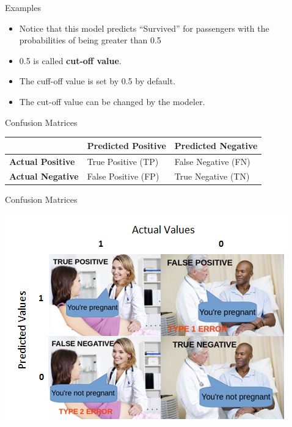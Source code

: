 \documentclass[
  ignorenonframetext,
]{beamer}
\providecommand{\tightlist}{%
  \setlength{\itemsep}{0pt}\setlength{\parskip}{0pt}}
\begin{document}
\begin{frame}{Examples}
\protect\hypertarget{examples-1}{}

\begin{itemize}
\tightlist
\item
  Notice that this model predicts ``Survived'' for passengers with the
  probabilities of being greater than 0.5
\item
  0.5 is called \textbf{cut-off value}.
\item
  The cuff-off value is set by 0.5 by default.
\item
  The cut-off value can be changed by the modeler.
\end{itemize}

\end{frame}

\begin{frame}{Confusion Matrices}
\protect\hypertarget{confusion-matrices}{}

\begin{longtable}[]{@{}lll@{}}
\toprule
& Predicted Positive & Predicted Negative\tabularnewline
\midrule
\endhead
\textbf{Actual Positive} & True Positive (TP) & False Negative
(FN)\tabularnewline
\textbf{Actual Negative} & False Positive (FP) & True Negative
(TN)\tabularnewline
\bottomrule
\end{longtable}

\end{frame}

\begin{frame}{Confusion Matrices}
\protect\hypertarget{confusion-matrices-1}{}

\includegraphics{images/cm.png}

\end{frame}
\end{document}
